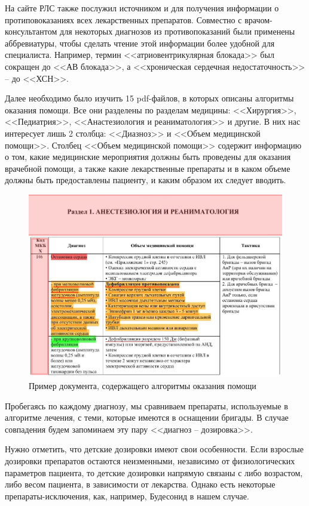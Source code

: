 На сайте РЛС также послужил источником и для получения информации о протиповоказаниях всех лекарственных препаратов. Совместно с врачом-консультантом для некоторых диагнозов из противопоказаний были применены аббревиатуры, чтобы сделать чтение этой информации более удобной для специалиста. Например, термин <<атриовентрикулярная блокада>> был сокращен до <<АВ блокада>>, а <<хроническая сердечная недостаточность>> -- до <<ХСН>>.

Далее необходимо было изучить 15 pdf-файлов, в которых описаны алгоритмы оказания помощи. Все они разделены по разделам медицины: <<Хирургия>>, <<Педиатрия>>, <<Анастезиология и реаниматология>> и другие. В них нас интересует лишь 2 столбца: <<Диазноз>> и <<Объем медицинской помощи>>. Столбец <<Объем медицинской помощи>> содержит информацию о том, какие медицинские мероприятия должны быть проведены для оказания врачебной помощи, а также какие лекарственные препараты и в каком объеме должны быть предоставлены пациенту, и каким образом их следует вводить. 

\begin{figure}
  \includegraphics[scale=0.6]{inc/пример алгоритма.jpg}
  \caption{Пример документа, содержащего алгоритмы оказания помощи}
  \label{fig:fig01}
\end{figure}

Пробегаясь по каждому диагнозу, мы сравниваем препараты, используемые в алгоритме лечения, с теми, которые имеются в оснащении бригады. В случае совпадения будем запоминаем эту пару <<диагноз -- дозировка>>.

Нужно отметить, что детские дозировки имеют свои особенности. Если взрослые дозировки препаратов остаются неизменными, независимо от физиологических параметров пациента, то детские дозировки напрямую связаны с либо возрастом, либо весом пациента, в зависимости от лекарства. Однако есть некоторые препараты-исключения, как, например, Будесонид в нашем случае.


